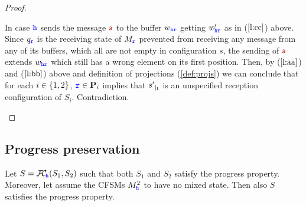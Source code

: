 \begin{proof}
\begin{description}
\begin{description}
In case ${\mathtt{\color{blue}{ {h}}}}$ sends the message $\msg[a]$ to the buffer $w_{{\mathtt{\color{blue}{ {h}}}}{\mathtt{\color{blue}{ {r}}}}}$ getting
$w'_{{\mathtt{\color{blue}{ {h}}}}{\mathtt{\color{blue}{ {r}}}}}$ as in ($\ref{l:cc}$) above. Since $q_{\mathtt{\color{blue}{ {r}}}}$ is the receiving state of $M_{\mathtt{\color{blue}{ {r}}}}$ prevented from receiving any message from any of its buffers, which all are not empty in configuration $s$, the sending of $\msg[a]$ extends $w_{{\mathtt{\color{blue}{ {h}}}}{\mathtt{\color{blue}{ {r}}}}}$ which still has a wrong element on its first position. Then, by ($\ref{l:aa}$) and ($\ref{l:bb}$) above 
and definition of projections (\cref{def:projs}) we can conclude that for each $i\in\{1,2\}$, 
${\mathtt{\color{blue}{ {r}}}}\in\mathbf{P}_i$ implies that ${s'}_{\mid_{\mathbf{i}}}$ is an unspecified reception configuration of $S_i$. Contradiction.
\end{description}
\end{description}
\end{proof}




\subsection{Progress preservation}



\begin{proposition}%
\label{lem:restrRS}
Let $S = {\mathcal{F}\!\mathcal{C}}_{\!{\mathtt{\color{blue}{ {h}}}}}(S_1,S_2)$ such that both $S_1$ and $S_2$ satisfy 
the progress property. 
Moreover, let assume the CFSMs $M^2_{{\mathtt{\color{blue}{ {h}}}}}$ to have no mixed state.
Then also $S$ satisfies the progress property. 
\end{proposition}

